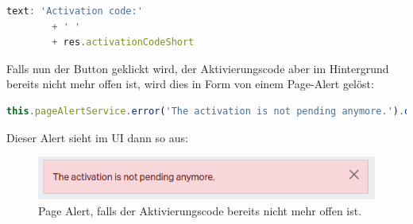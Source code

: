 \begin{lstlisting}[language=TypeScript]
text: 'Activation code:'
		+ ' '
		+ res.activationCodeShort

\end{lstlisting}
Falls nun der Button geklickt wird, der Aktivierungscode aber im Hintergrund bereits nicht mehr offen ist, wird dies in Form von einem Page-Alert gelöst:
\begin{lstlisting}[language=TypeScript]
this.pageAlertService.error('The activation is not pending anymore.').display();
\end{lstlisting}
Dieser Alert sieht im UI dann so aus:
\begin{figure}[H]
	\begin{center}
		\includegraphics[width=1.0\textwidth]{ressourcen/pagealert}
		\caption[Page Alert]{Page Alert, falls der Aktivierungscode bereits nicht mehr offen ist.}\label{fig:pagealert}
	\end{center}
\end{figure}


